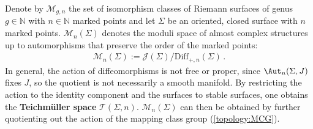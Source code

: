     \begin{construct}
        Denote by $\mathcal{M}_{g,n}$ the set of isomorphism classes of Riemann surfaces of genus $g\in\mathbb{N}$ with $n\in\mathbb{N}$ marked points and let $\Sigma$ be an oriented, closed surface with $n$ marked points. $\mathcal{M}_n(\Sigma)$ denotes the moduli space of almost complex structures up to automorphisms that preserve the order of the marked points:
        \begin{gather}
            \mathcal{M}_n(\Sigma) := \mathcal{J}(\Sigma)/\mathrm{Diff}_{+,n}(\Sigma)\,.
        \end{gather}
        In general, the action of diffeomorphisms is not free or proper, since $\Aut_n(\Sigma,J)$ fixes $J$, so the quotient is not necessarily a smooth manifold. By restricting the action to the identity component and the surfaces to stable surfaces, one obtains the \textbf{Teichm\"uller space} $\mathcal{T}(\Sigma,n)$. $\mathcal{M}_n(\Sigma)$ can then be obtained by further quotienting out the action of the mapping class group (\cref{topology:MCG}).
    \end{construct}

